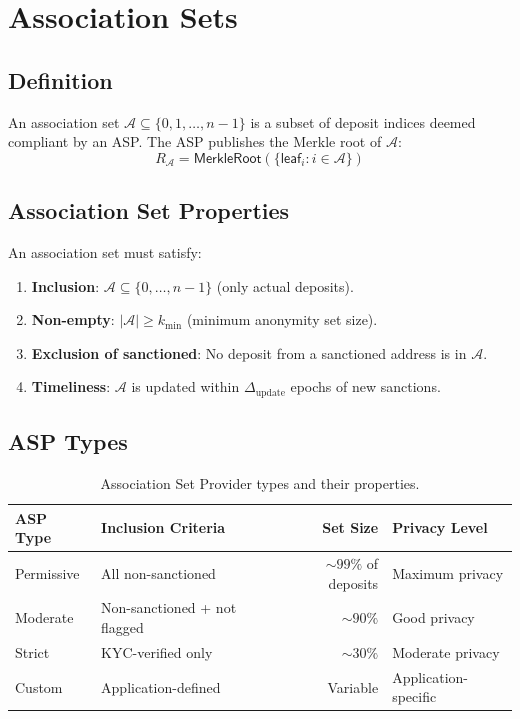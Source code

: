\section{Association Sets}
\label{sec:association}

\subsection{Definition}

\begin{definition}
An association set $\mathcal{A} \subseteq \{0, 1, \ldots, n-1\}$ is a subset of deposit indices deemed compliant by an ASP. The ASP publishes the Merkle root of $\mathcal{A}$:
\begin{equation}
    R_{\mathcal{A}} = \mathsf{MerkleRoot}(\{\mathsf{leaf}_i : i \in \mathcal{A}\})
\end{equation}
\end{definition}

\subsection{Association Set Properties}

An association set must satisfy:
\begin{enumerate}
    \item \textbf{Inclusion}: $\mathcal{A} \subseteq \{0, \ldots, n-1\}$ (only actual deposits).
    \item \textbf{Non-empty}: $|\mathcal{A}| \geq k_{\min}$ (minimum anonymity set size).
    \item \textbf{Exclusion of sanctioned}: No deposit from a sanctioned address is in $\mathcal{A}$.
    \item \textbf{Timeliness}: $\mathcal{A}$ is updated within $\Delta_{\text{update}}$ epochs of new sanctions.
\end{enumerate}

\subsection{ASP Types}

\begin{table}[H]
\centering
\caption{Association Set Provider types and their properties.}
\label{tab:asps}
\begin{tabular}{p{3cm}p{3cm}rp{3.5cm}}
\toprule
\textbf{ASP Type} & \textbf{Inclusion Criteria} & \textbf{Set Size} & \textbf{Privacy Level} \\
\midrule
Permissive & All non-sanctioned & $\sim 99\%$ of deposits & Maximum privacy \\
Moderate & Non-sanctioned + not flagged & $\sim 90\%$ & Good privacy \\
Strict & KYC-verified only & $\sim 30\%$ & Moderate privacy \\
Custom & Application-defined & Variable & Application-specific \\
\bottomrule
\end{tabular}
\end{table}

